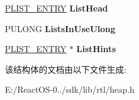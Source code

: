 \begin{DoxyCompactItemize}
\hyperlink{struct___l_i_s_t___e_n_t_r_y}{P\+L\+I\+S\+T\+\_\+\+E\+N\+T\+RY} {\bfseries List\+Head}
\item 
\mbox{\label{struct___h_e_a_p___l_i_s_t___l_o_o_k_u_p_a566d627e2a491e65f605eda9db6b7b5a}} 
P\+U\+L\+O\+NG {\bfseries Lists\+In\+Use\+Ulong}
\item 
\mbox{\label{struct___h_e_a_p___l_i_s_t___l_o_o_k_u_p_af3471cf43a684af77d0eea6b984d99c7}} 
\hyperlink{struct___l_i_s_t___e_n_t_r_y}{P\+L\+I\+S\+T\+\_\+\+E\+N\+T\+RY} $\ast$ {\bfseries List\+Hints}
\end{DoxyCompactItemize}


该结构体的文档由以下文件生成\+:\begin{DoxyCompactItemize}
\item 
E\+:/\+React\+O\+S-\/0../sdk/lib/rtl/heap.\+h\end{DoxyCompactItemize}
